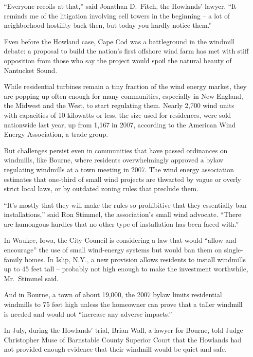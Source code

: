 ﻿\documentclass[12pt]{article}
\begin{document}
``Everyone recoils at that,'' said Jonathan D.~Fitch, the Howlands' lawyer. ``It reminds me of the
litigation involving cell towers in the beginning -- a lot of neighborhood hostility back then, but
today you hardly notice them.''

Even before the Howland case, Cape Cod was a battleground in the windmill debate: a proposal to
build the nation's first offshore wind farm has met with stiff opposition from those who say the
project would spoil the natural beauty of Nantucket Sound.

While residential turbines remain a tiny fraction of the wind energy market, they are popping up
often enough for many communities, especially in New England, the Midwest and the West, to start
regulating them. Nearly 2,700 wind units with capacities of 10 kilowatts or less, the size used for
residences, were sold nationwide last year, up from 1,167 in 2007, according to the American Wind
Energy Association, a trade group.

But challenges persist even in communities that have passed ordinances on windmills, like Bourne,
where residents overwhelmingly approved a bylaw regulating windmills at a town meeting in 2007. The
wind energy association estimates that one-third of small wind projects are thwarted by vague or
overly strict local laws, or by outdated zoning rules that preclude them.

``It's mostly that they will make the rules so prohibitive that they essentially ban
installations,'' said Ron Stimmel, the association's small wind advocate. ``There are humongous
hurdles that no other type of installation has been faced with.''

In Waukee, Iowa, the City Council is considering a law that would ``allow and encourage'' the use of
small wind-energy systems but would ban them on single-family homes. In Islip, N.Y., a new provision
allows residents to install windmills up to 45 feet tall -- probably not high enough to make the
investment worthwhile, Mr.~Stimmel said.

And in Bourne, a town of about 19,000, the 2007 bylaw limits residential windmills to 75 feet high
unless the homeowner can prove that a taller windmill is needed and would not ``increase any adverse
impacts.''

In July, during the Howlands' trial, Brian Wall, a lawyer for Bourne, told Judge Christopher Muse of
Barnstable County Superior Court that the Howlands had not provided enough evidence that their
windmill would be quiet and safe.
\end{document}
